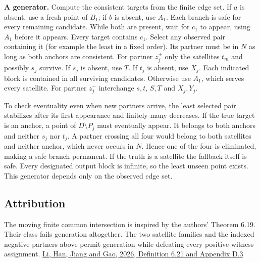\documentclass[11pt]{article}
\begin{document}
\textbf{A generator.} Compute the consistent targets from the finite edge set. If \(a\) is absent, use a fresh point of \(B_1\); if \(b\) is absent, use \(A_1\). Each branch is safe for every remaining candidate. While both are present, wait for \(c_1\) to appear, using \(A_1\) before it appears. Every target contains \(c_1\). Select any observed pair containing it (for example the least in a fixed order). Its partner must be in \(N\) as long as both anchors are consistent. For partner \(z_j^+\) only the satellites \(t_m\) and possibly \(s_j\) survive. If \(s_j\) is absent, use \(T\). If \(t_j\) is absent, use \(X_j\). Each indicated block is contained in all surviving candidates. Otherwise use \(A_1\), which serves every satellite. For partner \(z_j^-\) interchange \(s,t\), \(S,T\) and \(X_j,Y_j\).

To check eventuality even when new partners arrive, the least selected pair stabilizes after its first appearance and finitely many decreases. If the true target is an anchor, a point of \(D\setminus P_j\) must eventually appear. It belongs to both anchors and neither \(s_j\) nor \(t_j\). A partner crossing all four would belong to both satellites and neither anchor, which never occurs in \(N\). Hence one of the four is eliminated, making a safe branch permanent. If the truth is a satellite the fallback itself is safe. Every designated output block is infinite, so the least unseen point exists. This generator depends only on the observed edge set.

\subsection{Attribution}\label{attribution}

The moving finite common intersection is inspired by the authors' Theorem 6.19. Their class fails generation altogether. The two satellite families and the indexed negative partners above permit generation while defeating every positive-witness assignment. \href{https://arxiv.org/abs/2605.06211v2}{Li, Han, Jiang and Gao, 2026, Definition 6.21 and Appendix D.3}
\end{document}
